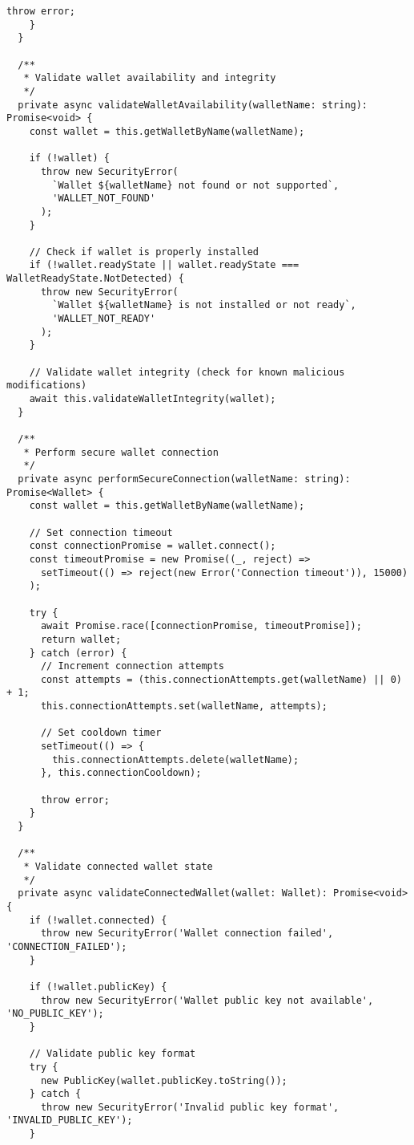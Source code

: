 \documentclass[11pt,a4paper]{article}
\begin{document}
\begin{lstlisting}[style=typescript, caption=Secure Wallet Provider Implementation]
      throw error;
    }
  }

  /**
   * Validate wallet availability and integrity
   */
  private async validateWalletAvailability(walletName: string): Promise<void> {
    const wallet = this.getWalletByName(walletName);
    
    if (!wallet) {
      throw new SecurityError(
        `Wallet ${walletName} not found or not supported`,
        'WALLET_NOT_FOUND'
      );
    }

    // Check if wallet is properly installed
    if (!wallet.readyState || wallet.readyState === WalletReadyState.NotDetected) {
      throw new SecurityError(
        `Wallet ${walletName} is not installed or not ready`,
        'WALLET_NOT_READY'
      );
    }

    // Validate wallet integrity (check for known malicious modifications)
    await this.validateWalletIntegrity(wallet);
  }

  /**
   * Perform secure wallet connection
   */
  private async performSecureConnection(walletName: string): Promise<Wallet> {
    const wallet = this.getWalletByName(walletName);
    
    // Set connection timeout
    const connectionPromise = wallet.connect();
    const timeoutPromise = new Promise((_, reject) => 
      setTimeout(() => reject(new Error('Connection timeout')), 15000)
    );

    try {
      await Promise.race([connectionPromise, timeoutPromise]);
      return wallet;
    } catch (error) {
      // Increment connection attempts
      const attempts = (this.connectionAttempts.get(walletName) || 0) + 1;
      this.connectionAttempts.set(walletName, attempts);

      // Set cooldown timer
      setTimeout(() => {
        this.connectionAttempts.delete(walletName);
      }, this.connectionCooldown);

      throw error;
    }
  }

  /**
   * Validate connected wallet state
   */
  private async validateConnectedWallet(wallet: Wallet): Promise<void> {
    if (!wallet.connected) {
      throw new SecurityError('Wallet connection failed', 'CONNECTION_FAILED');
    }

    if (!wallet.publicKey) {
      throw new SecurityError('Wallet public key not available', 'NO_PUBLIC_KEY');
    }

    // Validate public key format
    try {
      new PublicKey(wallet.publicKey.toString());
    } catch {
      throw new SecurityError('Invalid public key format', 'INVALID_PUBLIC_KEY');
    }


\end{lstlisting}
\end{document}
